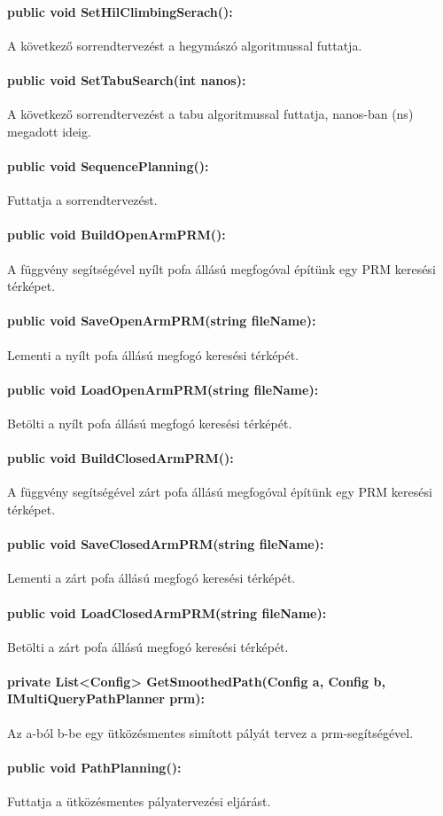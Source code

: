 \paragraph{public void SetHilClimbingSerach():}
A következő sorrendtervezést a hegymászó algoritmussal futtatja. 
\paragraph{public void SetTabuSearch(int nanos):}
A következő sorrendtervezést a tabu algoritmussal futtatja, nanos-ban (ns) megadott ideig.
\paragraph{public void SequencePlanning():}
Futtatja a sorrendtervezést.

\paragraph{public void BuildOpenArmPRM():}
A függvény segítségével nyílt pofa állású megfogóval építünk egy PRM keresési térképet.
\paragraph{public void SaveOpenArmPRM(string fileName):}
Lementi a nyílt pofa állású megfogó keresési térképét.
\paragraph{public void LoadOpenArmPRM(string fileName):}
Betölti a nyílt pofa állású megfogó keresési térképét.
\paragraph{public void BuildClosedArmPRM():}
A függvény segítségével zárt pofa állású megfogóval építünk egy PRM keresési térképet.
\paragraph{public void SaveClosedArmPRM(string fileName):}
Lementi a zárt pofa állású megfogó keresési térképét.
\paragraph{public void LoadClosedArmPRM(string fileName):}
Betölti a zárt pofa állású megfogó keresési térképét.
\paragraph{private  List<Config> GetSmoothedPath(Config a, Config b, IMultiQueryPathPlanner prm):}
Az a-ból b-be egy ütközésmentes simított pályát tervez a prm-segítségével.
\paragraph{public void PathPlanning():}
Futtatja a ütközésmentes pályatervezési eljárást.